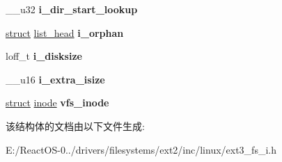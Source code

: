 \begin{DoxyCompactItemize}
\item 
\mbox{\label{structext3__inode__info_a609558a4e91020e5cb465027dd9079c5}} 
\+\_\+\+\_\+u32 {\bfseries i\+\_\+dir\+\_\+start\+\_\+lookup}
\item 
\mbox{\label{structext3__inode__info_affad27ca41c8a103d69122826be07357}} 
\hyperlink{interfacestruct}{struct} \hyperlink{structlist__head}{list\+\_\+head} {\bfseries i\+\_\+orphan}
\item 
\mbox{\label{structext3__inode__info_a83412fd7625d8f17650b3dfc02451f72}} 
loff\+\_\+t {\bfseries i\+\_\+disksize}
\item 
\mbox{\label{structext3__inode__info_a8506fd44b6dd56da191ae499318533ca}} 
\+\_\+\+\_\+u16 {\bfseries i\+\_\+extra\+\_\+isize}
\item 
\mbox{\label{structext3__inode__info_a76e7bb10abcd317ea7a8a5e200f9c5fc}} 
\hyperlink{interfacestruct}{struct} \hyperlink{structinode}{inode} {\bfseries vfs\+\_\+inode}
\end{DoxyCompactItemize}


该结构体的文档由以下文件生成\+:\begin{DoxyCompactItemize}
\item 
E\+:/\+React\+O\+S-\/0../drivers/filesystems/ext2/inc/linux/ext3\+\_\+fs\+\_\+i.\+h\end{DoxyCompactItemize}
